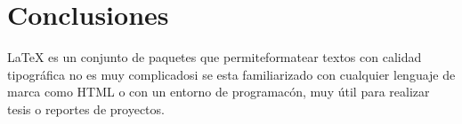  \section{ Conclusiones}
  LaTeX es un conjunto de paquetes que permiteformatear textos con calidad tipográfica no es muy complicadosi se esta familiarizado con cualquier lenguaje de marca como HTML  o con un entorno de programacón, muy útil para realizar tesis o reportes de proyectos.

%

